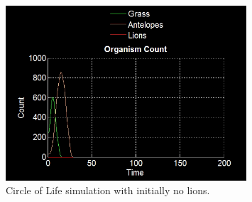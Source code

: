 \documentclass[11pt]{article}
\begin{document}
\begin{figure}
\centering
\includegraphics[width=0.8\textwidth]{noLionsOnlyCount.png}
\caption{Circle of Life simulation with initially no lions.}
\label{fig:noLions}
\end{figure}
\end{document}
